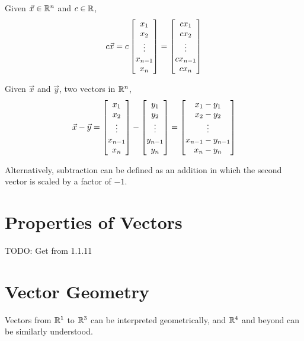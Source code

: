 \documentclass{mlatext}
\begin{document}
\begin{defn}
  Given $\vec{x} \in \mathbb{R}^n$ and $c \in \mathbb{R}$,
  \begin{equation*}
    c\vec{x} = c\begin{bmatrix} x_1\\x_2\\\vdots\\x_{n - 1}\\x_n \end{bmatrix} = \begin{bmatrix} cx_1\\cx_2\\\vdots\\cx_{n - 1}\\cx_n \end{bmatrix}
  \end{equation*}
\end{defn}

\begin{defn}[Subtraction]
  Given $\vec{x}$ and $\vec{y}$, two vectors in $\mathbb{R}^n$,
  \begin{equation*}
    \vec{x} - \vec{y} = \begin{bmatrix} x_1\\x_2\\\vdots\\x_{n - 1}\\x_n \end{bmatrix} - \begin{bmatrix} y_1\\y_2\\\vdots\\y_{n - 1}\\y_n \end{bmatrix} = \begin{bmatrix} x_1 - y_1\\x_2 - y_2\\\vdots\\x_{n-1} - y_{n-1}\\x_n - y_n \end{bmatrix}
  \end{equation*}

  Alternatively, subtraction can be defined as an addition in which the second vector is scaled by a factor of $-1$.
\end{defn}

\section{Properties of Vectors}
TODO: Get from 1.1.11

\section{Vector Geometry}
Vectors from $\mathbb{R}^1$ to $\mathbb{R}^3$ can be interpreted geometrically, and $\mathbb{R}^4$ and beyond can be similarly understood.
\end{document}
